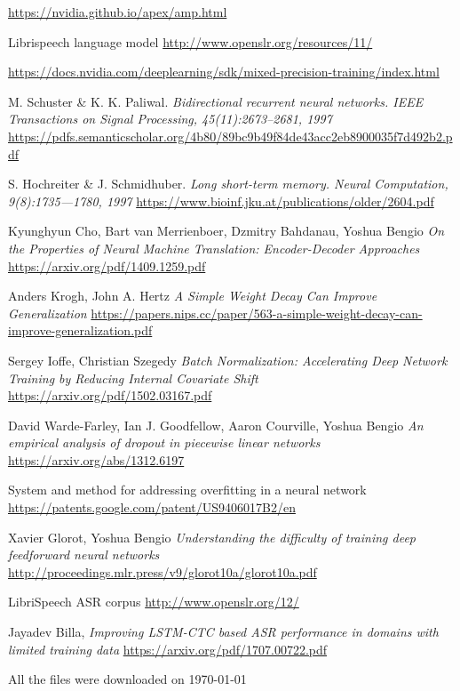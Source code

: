 \documentclass[licencjacka,en]{pracamgr}
\newcommand{\bibDownloadDate}{\today}
\begin{document}
\begin{thebibliography}{99}
 \href{https://nvidia.github.io/apex/amp.html}{https://nvidia.github.io/apex/amp.html}

 Librispeech language model
\href{http://www.openslr.org/resources/11/}{http://www.openslr.org/resources/11/}

 \href{https://docs.nvidia.com/deeplearning/sdk/mixed-precision-training/index.html}{https://docs.nvidia.com/deeplearning/sdk/mixed-precision-training/index.html}

 M. Schuster \& K. K. Paliwal. \textit{Bidirectional recurrent neural networks. IEEE Transactions on Signal Processing, 45(11):2673–2681, 1997} \href{https://pdfs.semanticscholar.org/4b80/89bc9b49f84de43acc2eb8900035f7d492b2.pdf}{https://pdfs.semanticscholar.org/4b80/89bc9b49f84de43acc2eb8900035f7d492b2.pdf}

 S. Hochreiter \& J. Schmidhuber. \textit{Long short-term memory. Neural Computation, 9(8):1735—1780, 1997} \href{https://www.bioinf.jku.at/publications/older/2604.pdf}{https://www.bioinf.jku.at/publications/older/2604.pdf}

 Kyunghyun Cho, Bart van Merrienboer, Dzmitry Bahdanau, Yoshua Bengio \textit{On the Properties of Neural Machine Translation: Encoder-Decoder Approaches} \href{https://arxiv.org/pdf/1409.1259.pdf}{https://arxiv.org/pdf/1409.1259.pdf}

 Anders Krogh, John A. Hertz \textit{A Simple Weight Decay Can Improve Generalization} \href{https://papers.nips.cc/paper/563-a-simple-weight-decay-can-improve-generalization.pdf}{https://papers.nips.cc/paper/563-a-simple-weight-decay-can-improve-generalization.pdf}

 Sergey Ioffe, Christian Szegedy \textit{Batch Normalization: Accelerating Deep Network Training by Reducing Internal Covariate Shift} \href{https://arxiv.org/pdf/1502.03167.pdf}{https://arxiv.org/pdf/1502.03167.pdf}

 David Warde-Farley, Ian J. Goodfellow, Aaron Courville, Yoshua Bengio \textit{An empirical analysis of dropout in piecewise linear networks
} \href{https://arxiv.org/abs/1312.6197}{https://arxiv.org/abs/1312.6197}

 System and method for addressing overfitting in a neural network \href{https://patents.google.com/patent/US9406017B2/en}{https://patents.google.com/patent/US9406017B2/en}

 Xavier Glorot, Yoshua Bengio \textit{Understanding the difficulty of training deep feedforward neural networks} \href{http://proceedings.mlr.press/v9/glorot10a/glorot10a.pdf}{http://proceedings.mlr.press/v9/glorot10a/glorot10a.pdf}

 LibriSpeech ASR corpus \href{http://www.openslr.org/12/}{http://www.openslr.org/12/}

 Jayadev Billa, \textit{Improving LSTM-CTC based ASR performance in
domains with limited training data}
\href{https://arxiv.org/pdf/1707.00722.pdf}{https://arxiv.org/pdf/1707.00722.pdf}

\end{thebibliography}
All the files were downloaded on \bibDownloadDate
\end{document}
